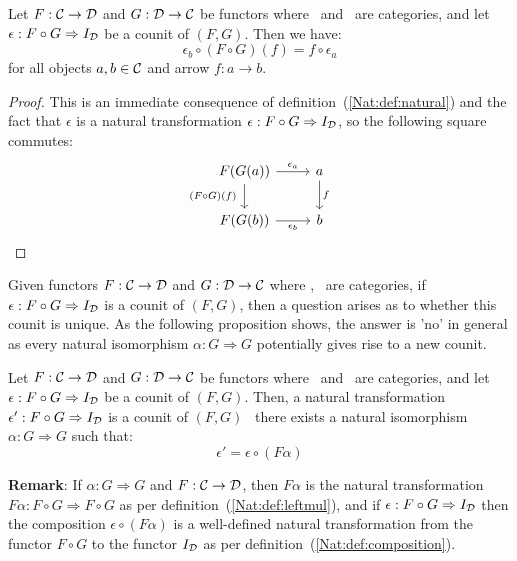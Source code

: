 \begin{prop}\label{Adj:prop:counit:natural}
    Let $F:\mbox{$\cal C$}\to\mbox{$\cal D$}$ and $G:\mbox{$\cal D$}\to\mbox{$\cal C$}$ be functors where \Cat\ and \Dat\ 
    are categories, and let $\epsilon:F\circ G\Rightarrow I_{\cal D}$ be a counit 
    of $(F,G)$. Then we have:
        \[
            \epsilon_{b}\circ(F\circ G)(f)=f\circ\epsilon_{a}
        \]
    for all objects $a,b\in\mbox{$\cal C$}$ and arrow $f:a\to b$.
\end{prop}
\begin{proof}
    This is an immediate consequence of definition~(\ref{Nat:def:natural}) 
    and the fact that $\epsilon$ is a natural transformation 
    $\epsilon:F\circ G\Rightarrow I_{\cal D}$, so the following square commutes:
    \[
        \begin{tikzcd}
            F(G(a))\arrow[r, "\epsilon_{a}"]\arrow[d, swap,"(F\circ G)(f)\ "]
            &a\arrow[d, "f"]
            \\
            F(G(b))\arrow[r, swap, "\epsilon_{b}"]
            &b
        \end{tikzcd}
    \]
\end{proof}

Given functors $F:\mbox{$\cal C$}\to\mbox{$\cal D$}$ and $G:\mbox{$\cal D$}\to\mbox{$\cal C$}$ where \Cat, \Dat\ are 
categories, if $\epsilon:F\circ G\Rightarrow I_{\cal D}$ is a counit of $(F,G)$,
then a question arises as to whether this counit is unique. As the following
proposition shows, the answer is 'no' in general as every natural 
isomorphism $\alpha : G\Rightarrow G$ potentially gives rise to a 
new counit.

\begin{prop}\label{Adj:prop:counit:not:unique}
    Let $F:\mbox{$\cal C$}\to\mbox{$\cal D$}$ and $G:\mbox{$\cal D$}\to\mbox{$\cal C$}$ be functors where \Cat\ and \Dat\ 
    are categories, and let $\epsilon:F\circ G\Rightarrow I_{\cal D}$ be a counit
    of $(F,G)$. Then, a natural transformation $\epsilon':F\circ G\Rightarrow 
    I_{\cal D}$ is a counit of $(F,G)$ \ifand\ there exists a natural isomorphism 
    $\alpha:G\Rightarrow G$ such that:
        \[
            \epsilon'=\epsilon\circ(F\alpha)
        \]
\end{prop}

\noindent
{\bf Remark}: If $\alpha: G\Rightarrow G$ and $F:\mbox{$\cal C$}\to\mbox{$\cal D$}$, then $F\alpha$
is the natural transformation $F\alpha:F\circ G\Rightarrow F\circ G$ as per
definition~(\ref{Nat:def:leftmul}), and if $\epsilon:F\circ G\Rightarrow 
I_{\cal D}$ then the composition $\epsilon\circ(F\alpha)$ is a well-defined 
natural transformation from the functor $F\circ G$ to the functor $I_{\cal D}$ 
as per definition~(\ref{Nat:def:composition}).

